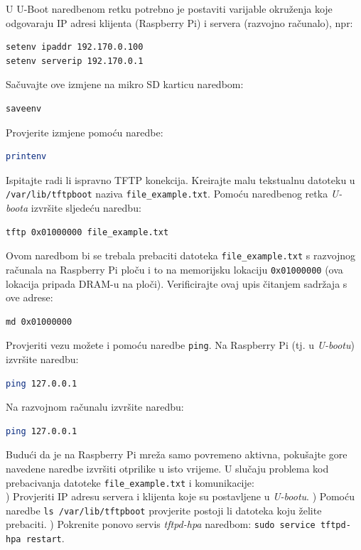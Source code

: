 \documentclass[11pt]{article}
\begin{document}
U U-Boot naredbenom retku potrebno je postaviti varijable okruženja koje
 odgovaraju IP adresi klijenta (Raspberry Pi) i servera (razvojno računalo),
 npr:
\begin{lstlisting}[language=bash]
setenv ipaddr 192.170.0.100
setenv serverip 192.170.0.1
\end{lstlisting}
Sačuvajte ove izmjene na mikro SD karticu naredbom:
\begin{lstlisting}[language=bash]
saveenv
\end{lstlisting}
Provjerite izmjene pomoću naredbe:
\begin{lstlisting}[language=bash]
printenv
\end{lstlisting}
Ispitajte radi li ispravno TFTP konekcija. Kreirajte malu tekstualnu datoteku u
 \texttt{/var/lib/tftpboot} naziva \texttt{file\_example.txt}. Pomoću
 naredbenog retka \textit{U-boota} izvršite sljedeću naredbu:
\begin{lstlisting}[language=bash]
tftp 0x01000000 file_example.txt
\end{lstlisting}
Ovom naredbom bi se trebala prebaciti datoteka \texttt{file\_example.txt} s
 razvojnog računala na Raspberry Pi ploču i to na memorijsku lokaciju
 \texttt{0x01000000} (ova lokacija pripada DRAM-u na ploči). Verificirajte ovaj
 upis čitanjem sadržaja s ove adrese:
\begin{lstlisting}[language=bash]
md 0x01000000
\end{lstlisting}
Provjeriti vezu možete i pomoću naredbe \texttt{ping}. Na Raspberry Pi (tj. u
 \textit{U-bootu}) izvršite naredbu:
\begin{lstlisting}[language=bash]
ping 127.0.0.1
\end{lstlisting}
Na razvojnom računalu izvršite naredbu:
\begin{lstlisting}[language=bash]
ping 127.0.0.1
\end{lstlisting}
Budući da je na Raspberry Pi mreža samo povremeno aktivna, pokušajte gore
 navedene naredbe izvršiti otprilike u isto vrijeme.
 U slučaju problema kod prebacivanja datoteke \texttt{file\_example.txt} i
 komunikacije: \\
) Provjeriti IP adresu servera i klijenta koje su postavljene u
 \textit{U-bootu}.
) Pomoću naredbe \texttt{ls /var/lib/tftpboot} provjerite postoji li datoteka
 koju želite prebaciti.
) Pokrenite ponovo servis \textit{tftpd-hpa} naredbom: \texttt{sudo service
 tftpd-hpa restart}.
\end{document}

